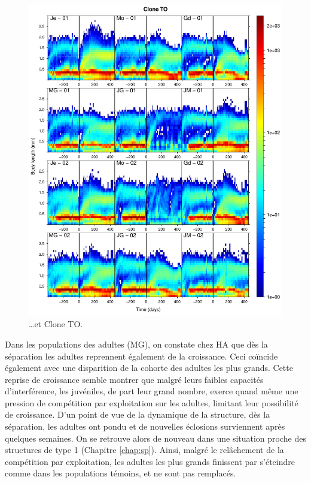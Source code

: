 {{\begin{figure}[p]
		\includegraphics[width=\textwidth]{1_CorpsDeThese/Resumes/Fig/SM03b}
        \caption*{\ldots et Clone TO.}
    \end{figure}
    \clearpage
    }%
}



Dans les populations des adultes (MG), on constate chez HA que dès la
séparation les adultes reprennent également de la croissance. Ceci coïncide
également avec une disparition de la cohorte des adultes les plus grands. Cette
reprise de croissance semble montrer que malgré leurs faibles capacités
d'interférence, les juvéniles, de part leur grand nombre, exerce quand même une
pression de compétition par exploitation sur les adultes, limitant leur
possibilité de croissance. D'un point de vue de la dynamique de la structure,
dès la séparation, les adultes ont pondu et de nouvelles éclosions surviennent
après quelques semaines. On se retrouve alors de nouveau dans une situation
proche des structures de type 1 (Chapitre \ref{chap:sp}). Ainsi, malgré le
relâchement de la compétition par exploitation, les adultes les plus grands finissent par s'éteindre comme
dans les populations témoins, et ne sont pas remplacés. 

